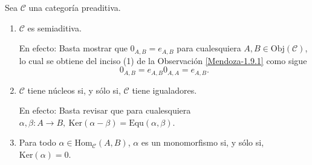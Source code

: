 \documentclass[tesis]{subfiles}
\begin{document}
\begin{Obs}\label{Mendoza-1.9.1 preaditiva}

    Sea $\mathscr{C}$ una categoría preaditiva.

    \begin{enumerate}[label=(\arabic*)]
            
        \item $\mathscr{C}$ es semiaditiva.

            En efecto: Basta mostrar que $0_{A,B}=e_{A,B}$ para cualesquiera $A,B\in\text{Obj}(\mathscr{C})$, lo cual se obtiene del inciso (1) de la Observación \ref{Mendoza-1.9.1} como sigue
            \[
                0_{A,B} = e_{A,B} 0_{A,A} = e_{A,B}.
            \] 

            \item $\mathscr{C}$ tiene núcleos si, y sólo si, $\mathscr{C}$ tiene igualadores.

                En efecto: Basta revisar que para cualesquiera $\alpha,\beta:A\to B, \ \text{Ker}(\alpha-\beta) = \text{Equ}(\alpha,\beta)$.

            \item Para todo $\alpha\in\text{Hom}_\mathscr{C}(A,B)$, $\alpha$ es un monomorfismo si, y sólo si, $\text{Ker}(\alpha)=0$.
    \end{enumerate}
\end{Obs}
\end{document}
